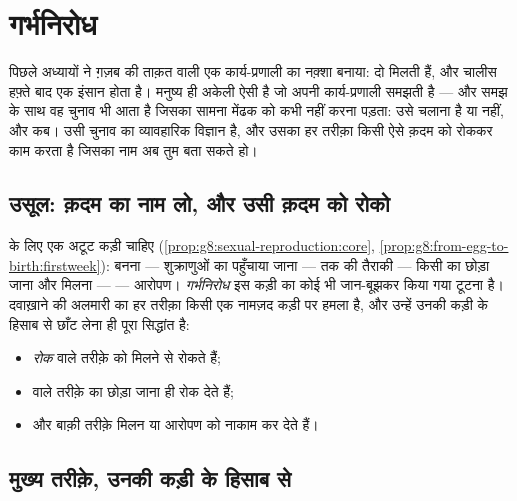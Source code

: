 \chapter{गर्भनिरोध}\label{ch:g8:contraception}

पिछले अध्यायों ने ग़ज़ब की ताक़त वाली एक कार्य-प्रणाली का नक़्शा बनाया:
दो  मिलती हैं, और चालीस हफ़्ते बाद एक इंसान होता है। मनुष्य ही
अकेली ऐसी  है जो अपनी कार्य-प्रणाली समझती है --- और समझ के साथ
वह चुनाव भी आता है जिसका सामना मेंढक को कभी नहीं करना पड़ता: उसे चलाना
है या नहीं, और कब। \emph{} उसी चुनाव का व्यावहारिक विज्ञान है,
और उसका हर तरीक़ा किसी ऐसे क़दम को रोककर काम करता है जिसका नाम अब तुम
बता सकते हो।

\section{उसूल: क़दम का नाम लो, और उसी क़दम को रोको}

\begin{proposition}[गर्भनिरोध कार्य-प्रणाली पर ही बैठता है]\label{prop:g8:contraception:principle}
 के लिए एक अटूट कड़ी चाहिए
(\cref{prop:g8:sexual-reproduction:core},
\cref{prop:g8:from-egg-to-birth:firstweek}):  बनना --- शुक्राणुओं
का पहुँचाया जाना ---  तक की तैराकी --- किसी  का छोड़ा
जाना और मिलना ---  --- आरोपण। \emph{गर्भनिरोध}
इस कड़ी का कोई भी जान-बूझकर किया गया टूटना है। दवाख़ाने की अलमारी का हर
तरीक़ा किसी एक नामज़द कड़ी पर हमला है, और उन्हें उनकी कड़ी के हिसाब से
छाँट लेना ही पूरा सिद्धांत है:
\begin{itemize}
  \item \emph{रोक} वाले तरीक़े  को मिलने से रोकते हैं;
  \item \emph{} वाले तरीक़े  का छोड़ा जाना ही रोक देते
        हैं;
  \item और बाक़ी तरीक़े मिलन या आरोपण को नाकाम कर देते हैं।
\end{itemize}
\end{proposition}
\admitted

\section{मुख्य तरीक़े, उनकी कड़ी के हिसाब से}


